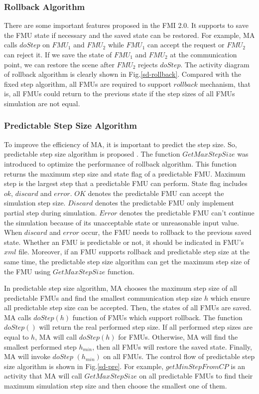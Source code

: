 \subsubsection{Rollback Algorithm}
There are some important features proposed in the FMI 2.0. It supports to save the FMU state if necessary and the saved state can be restored. For example, MA calls $doStep$ on $FMU_{1}$ and $FMU_{2}$ while $FMU_{1}$ can accept the request or $FMU_{2}$ can reject it. If we save the state of $FMU_{1}$ and $FMU_{2}$ at the communication point, we can restore the scene after $FMU_{2}$ rejects $doStep$. The activity diagram of rollback algorithm \cite{BromanBGLMTW13} is clearly shown in Fig.\ref{sd-rollback}. Compared with the fixed step algorithm, all FMUs are required to support $rollback$ mechanism, that is, all FMUs could return to the previous state if the step sizes of all FMUs simulation are not equal.
\subsubsection{Predictable Step Size Algorithm}
To improve the efficiency of MA, it is important to predict the step size. So, predictable step size algorithm is proposed \cite{BromanBGLMTW13}. The function $GetMaxStepSize$ was introduced to optimize the performance of rollback algorithm. This function returns the maximum step size and state flag of a predictable FMU. Maximum step is the largest step that a predictable FMU can perform. State flag includes $ok$, $discard$ and $error$. $OK$ denotes the predictable FMU can accept the simulation step size. $Discard$ denotes the predictable FMU only implement partial step during simulation. $Error$ denotes the predictable FMU can't continue the simulation because of its unacceptable state or unreasonable input value. When $discard$ and $error$ occur, the FMU needs to rollback to the previous saved state. Whether an FMU is predictable or not, it should be indicated in FMU's $xml$ file. Moreover, if an FMU supports rollback and predictable step size at the same time, the predictable step size algorithm can get the maximum step size of the FMU using $GetMaxStepSize$ function.

In predictable step size algorithm, MA chooses the maximum step size of all predictable FMUs and find the smallest communication step size $h$ which ensure all predictable step size can be accepted. Then, the states of all FMUs are saved. MA calls $doStep(h)$ function of FMUs which support rollback. The function $doStep()$ will return the real performed step size. If all performed step sizes are equal to $h$, MA will call $doStep(h)$ for FMUs. Otherwise, MA will find the smallest performed step $h_{min}$, then all FMUs will restore the saved state. Finally, MA will invoke $doStep$ $(h_{min})$ on all FMUs. The control flow of predictable step size algorithm is shown in Fig.\ref{sd-pre}. For example, $getMinStepFromCP$ is an activity that MA will call $GetMaxStepSize$ on all predictable FMUs to find their maximum simulation step size and then choose the smallest one of them. 

